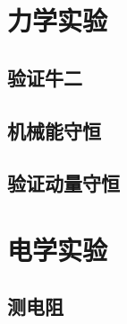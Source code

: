 \documentclass[cn,blue,11pt,normal]{elegantnote}
\begin{document}
\newpage
\section{力学实验}
\begin{proset}
	
\end{proset}

\begin{proset}
	
\end{proset}
\begin{proset}
	
\end{proset}

\begin{proset}
	
\end{proset}
\begin{proset}
	
\end{proset}

\subsection{验证牛二}
\begin{proset}
	
\end{proset}

\subsection{机械能守恒}

\begin{proset}
	
\end{proset}

\subsection{验证动量守恒}
\begin{proset}
	
\end{proset}


\newpage
\section{电学实验}

\subsection{测电阻}
\begin{proset}
	
\end{proset}
\end{document}

